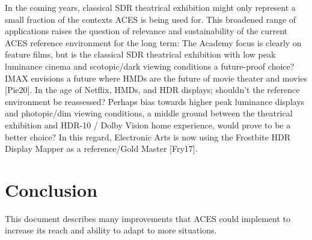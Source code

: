 \documentclass[conference]{IEEEtran}
\begin{document}
In the coming years, classical SDR theatrical exhibition might only represent a small fraction of the contexts ACES is being used for. This broadened range of applications raises the question of relevance and sustainability of the current ACES reference environment for the long term: The Academy focus is clearly on feature films, but is the classical SDR theatrical exhibition with low peak luminance cinema and scotopic/dark viewing conditions a future-proof choice? IMAX envisions a future where HMDs are the future of movie theater and movies [Pie20]. In the age of Netflix, HMDs, and HDR displays; shouldn't the reference environment be reassessed? Perhaps bias towards higher peak luminance displays and photopic/dim viewing conditions, a middle ground between the theatrical exhibition and HDR-10 / Dolby Vision home experience, would prove to be a better choice? In this regard, Electronic Arts is now using the Frostbite HDR Display Mapper as a reference/Gold Master [Fry17].

\section{Conclusion}
This document describes many improvements that ACES could implement to increase its reach and ability to adapt to more situations.
\end{document}
